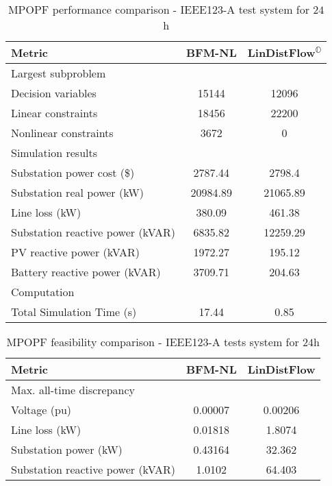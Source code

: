 \documentclass[../../outputs/main.tex]{subfiles}
\begin{document}
\begin{table}[t] %
    \centering
    \caption{MPOPF performance comparison - IEEE123-A test system for $24$h}
    \begin{tabular}{|l|c|c|}
    \hline
    \textbf{Metric} & \textbf{BFM-NL} & \textbf{LinDistFlow\textsuperscript{\(\mathbb{O}\)}} \\ \hline
    Largest subproblem & \multicolumn{2}{c|}{} \\ \hline
    \quad Decision variables & {15144} & {12096} \\ \hline
    \quad Linear constraints & {18456} & {22200} \\ \hline
    \quad Nonlinear constraints & {3672} & {0} \\ \hline
    Simulation results  & \multicolumn{2}{c|}{} \\ \hline
    \quad Substation power cost (\$) & 2787.44 & 2798.4 \\ \hline
    \quad Substation real power (kW) & 20984.89 & 21065.89 \\ \hline
    \quad Line loss (kW) & 380.09 & 461.38 \\ \hline
    \quad Substation reactive power (kVAR) & 6835.82 & 12259.29 \\ \hline
    \quad PV reactive power (kVAR) & 1972.27 & 195.12 \\ \hline
    \quad Battery reactive power (kVAR) & 3709.71 & 204.63 \\ \hline
    Computation  & \multicolumn{2}{c|}{} \\ \hline
    \quad Total Simulation Time (s) & 17.44 & 0.85 \\ \hline
    \end{tabular}
    \label{table:opt-5-20-30}
    \vspace{-3mm}
\end{table}

\begin{table}[t]
    \centering
    \caption{MPOPF feasibility comparison - IEEE123-A tests system for $24$h}
    \begin{tabular}{|l|c|c|}
    \hline
    \textbf{Metric} & \textbf{BFM-NL} & \textbf{LinDistFlow} \\ \hline
    Max. all-time discrepancy & \multicolumn{2}{c|}{} \\ \hline
    \quad Voltage (pu) & 0.00007 & 0.00206 \\ \hline
    \quad Line loss (kW) & 0.01818 & 1.8074 \\ \hline
    \quad Substation power (kW) & 0.43164 & 32.362 \\ \hline
    \quad Substation reactive power (kVAR) & 1.0102 & 64.403 \\ \hline
    \end{tabular}
    \label{table:feas-ieee123A-24h}
    \vspace{-3mm}
\end{table}
\end{document}
